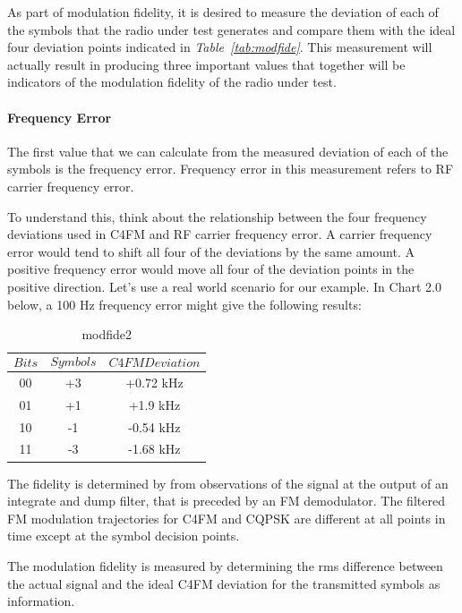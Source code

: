 	As part of modulation fidelity, it is desired to measure the deviation of each of the symbols that the radio under test generates and compare them with the ideal four deviation points indicated in \textit{Table~\ref{tab:modfide}}. This measurement will actually result in producing three important values that together will be indicators of the modulation fidelity of the radio under test.


\paragraph{Frequency Error}
\- \indent

	The first value that we can calculate from the measured deviation of each of the symbols is the frequency error. Frequency error in this measurement refers to RF carrier frequency error.
		
	To understand this, think about the relationship between the four frequency deviations used in C4FM and RF carrier frequency error. A carrier frequency error would tend to shift all four of the deviations by the same amount. A positive frequency error would move all four of the deviation points in the positive direction. Let’s use a real world scenario for our example. In Chart 2.0 below, a 100 Hz frequency error might give the following results:


\begin{table}[H]
  \centering
 
    \begin{tabular}{c|c|c}
       $$Bits$$ & $$Symbols$$ & $$C4FM Deviation$$ \\ \hline
       00 & +3 & +0.72 kHz  \\ \hline
       01 & +1 & +1.9 kHz  \\ \hline
       10 & -1 & -0.54 kHz  \\ \hline
       11 & -3 & -1.68 kHz  
      
  \end{tabular}
  \caption{modfide2}
  \label{tab:modfide2}
\end{table}

The fidelity is determined by from observations of the signal at the output of an integrate and dump filter, that is preceded by an FM demodulator. The filtered FM modulation trajectories for C4FM and CQPSK are different at all points in time except at the symbol decision points.
	
	The modulation fidelity is measured by determining the rms difference between the actual signal and the ideal C4FM deviation for the transmitted symbols as information.
	
